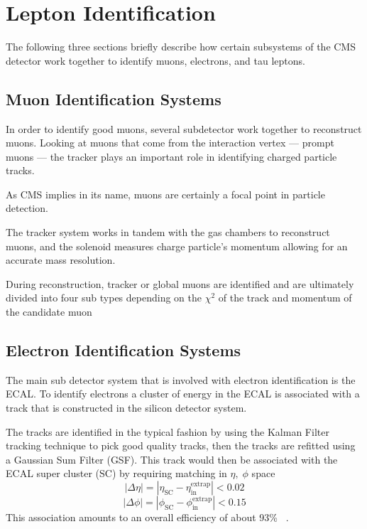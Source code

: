 
\section{Lepton Identification}
The following three sections briefly describe how certain subsystems of the CMS detector work together to identify muons, electrons, and tau leptons. 

\subsection{Muon Identification Systems}

In order to identify good muons, several subdetector work together to reconstruct muons. Looking at muons that come from the interaction vertex --- prompt muons --- the tracker plays an important role in identifying charged particle tracks. 

As CMS implies in its name, muons are certainly a focal point in particle detection. 

The tracker system works in tandem with the gas chambers to reconstruct muons, and the solenoid measures charge particle's momentum allowing for an accurate mass resolution.  


During reconstruction, tracker or global muons are identified and are ultimately divided into four sub types depending on the $\chi^2$ of the track and momentum of the candidate muon ~\cite{CMS-PAS-PFT-09-001,Kratschmer:1956760}


\subsection{Electron Identification Systems}

The main sub detector system that is involved with electron identification is the ECAL. To identify electrons a cluster of energy in the ECAL is associated with a track that is constructed in the silicon detector system. 

The tracks are identified in the typical fashion by using the Kalman Filter tracking technique to pick good quality tracks, then the tracks are refitted using a Gaussian Sum Filter (GSF). 
This track would then be associated with the ECAL super cluster (SC) by requiring matching in $\eta,\;\phi$ space
\[|\Delta\eta| = |\eta_{\text{SC}} - \eta_{\text{in}}^{\text{extrap}}| < 0.02\]
\[|\Delta\phi| = |\phi_{\text{SC}} - \phi_{\text{in}}^{\text{extrap}}| < 0.15\]
This association amounts to an overall efficiency of about 93\% ~\cite{Khachatryan:2015hwa}. 



